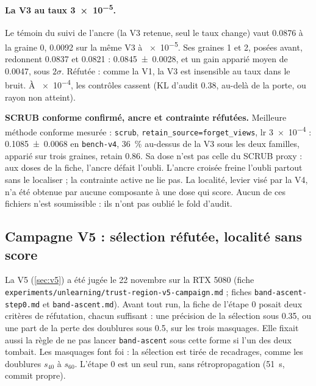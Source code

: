\documentclass[11pt,a4paper]{article}
\newcommand{\code}[1]{\texttt{#1}}
\newcommand{\chemin}[1]{\nolinkurl{#1}}%
\begin{document}
\paragraph{La V3 au taux \num{3e-5}.} Le témoin du suivi de l'ancre (la V3 retenue, seul le taux
change) vaut \num{0.0876} à la graine 0, \num{+0.0092} sur la même V3 à \num{e-5}. Ses graines 1 et
2, posées avant, redonnent \num{0.0837} et \num{0.0821} : \num{0.0845 +- 0.0028}, et un gain apparié
moyen de \num{+0.0047}, sous $2\sigma$. Réfutée : comme la V1, la V3 est insensible au taux dans le
bruit. À \num{e-4}, les contrôles cassent (KL d'audit \num{0.38}, au-delà de la porte, ou rayon non
atteint).

\begin{retenir}
\textbf{SCRUB conforme confirmé, ancre et contrainte réfutées.} Meilleure méthode conforme mesurée :
\code{scrub}, \code{retain\_source=forget\_views}, lr \num{3e-4} : \num{0.1085 +- 0.0068} en
\code{bench-v4}, \SI{36}{\percent} au-dessus de la V3 sous les deux familles, apparié sur trois
graines, retain \num{0.86}. Sa dose n'est pas celle du SCRUB proxy : aux doses de la fiche, l'ancre
défait l'oubli. L'ancre croisée freine l'oubli partout sans le localiser ; la contrainte active ne
lie pas. La localité, levier visé par la V4, n'a été obtenue par aucune composante à une dose qui
score. Aucun de ces fichiers n'est soumissible : ils n'ont pas oublié le fold d'audit.
\end{retenir}

\subsection{Campagne V5 : sélection réfutée, localité sans score}\label{sec:campagnev5}
La V5 (\cref{sec:v5}) a été jugée le 22 novembre sur la RTX 5080 (fiche
\chemin{experiments/unlearning/trust-region-v5-campaign.md} ; fiches \chemin{band-ascent-step0.md} et
\chemin{band-ascent.md}). Avant tout run, la fiche de l'étape 0 posait deux critères de réfutation,
chacun suffisant : une précision de la sélection sous \num{0.35}, ou une part de la perte des
doublures sous \num{0.5}, sur les trois masquages. Elle fixait aussi la règle de ne pas lancer
\code{band-ascent} sous cette forme si l'un des deux tombait. Les masquages font foi : la sélection
est tirée de recadrages, comme les doublures $s_{40}$ à $s_{60}$. L'étape 0 est un seul run, sans
rétropropagation (\SI{51}{\second}, commit propre).
\end{document}
